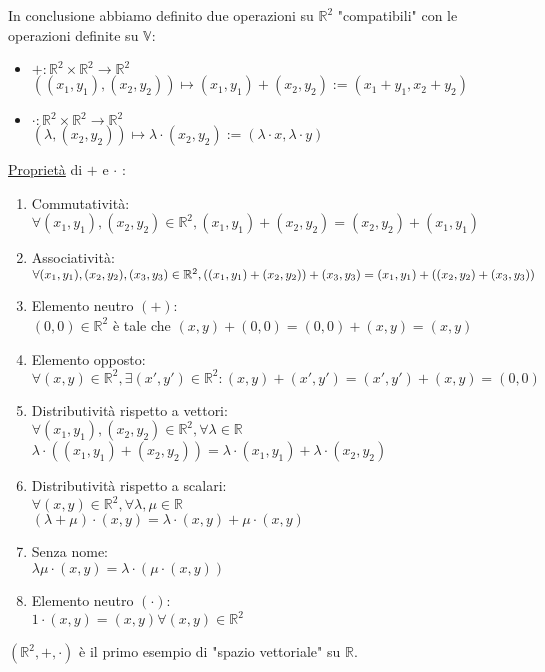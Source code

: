 \documentclass{article}
\newcommand{\ul}[1]{\underline{#1}}
\newcommand{\R}{\mathbb{R}}
\newcommand{\V}{\mathbb{V}}
\begin{document}
	In conclusione abbiamo definito due operazioni su $\R^2$ "compatibili" con le operazioni definite su $\V$:
	\begin{itemize}
		\item $+: \R^2\times\R^2\rightarrow\R^2$\\$((x_1,y_1),(x_2,y_2))\mapsto(x_1,y_1)+(x_2,y_2):=(x_1+y_1,x_2+y_2)$
		\item $\cdot: \R^2\times\R^2\rightarrow\R^2$\\\hspace*{-0.3em}$(\lambda,(x_2,y_2))\mapsto\lambda\cdot(x_2,y_2):=(\lambda\cdot x,\lambda\cdot y)$
	\end{itemize}
	\ul{Proprietà} di $+$ e $\cdot$ :
	\begin{enumerate}
		\item Commutatività:\\$\forall(x_1,y_1),(x_2,y_2)\in\R^2, (x_1,y_1)+(x_2,y_2)=(x_2,y_2)+(x_1,y_1)$
		\item Associatività:\\$\forall(x_1,y_1),(x_2,y_2),(x_3,y_3)\in\R^2,\\((x_1,y_1)+(x_2,y_2))+(x_3,y_3)=(x_1,y_1)+((x_2,y_2)+(x_3,y_3))$
		\item Elemento neutro $(+)$:\\$(0,0)\in\R^2$ è tale che $(x,y)+(0,0)=(0,0)+(x,y)=(x,y)$
		\item Elemento opposto:\\$\forall(x,y)\in\R^2,\exists(x',y')\in\R^2:(x,y)+(x',y')=(x',y')+(x,y)=(0,0)$
		\item Distributività rispetto a vettori:\\$\forall(x_1,y_1),(x_2,y_2)\in\R^2,\forall\lambda\in\R$\\$\lambda\cdot((x_1,y_1)+(x_2,y_2))=\lambda\cdot(x_1,y_1)+\lambda\cdot(x_2,y_2)$
		\item Distributività rispetto a scalari:\\$\forall(x,y)\in\R^2,\forall\lambda,\mu\in\R$\\$(\lambda+\mu)\cdot(x,y)=\lambda\cdot(x,y)+\mu\cdot(x,y)$
		\item Senza nome:\\$\lambda\mu\cdot(x,y)=\lambda\cdot(\mu\cdot(x,y))$
		\item Elemento neutro $(\cdot)$:\\$1\cdot(x,y)=(x,y)\forall(x,y)\in\R^2$
	\end{enumerate}
$(\R^2,+,\cdot)$ è il primo esempio di "spazio vettoriale" su $\R$.\vspace*{1em}\\
\end{document}

